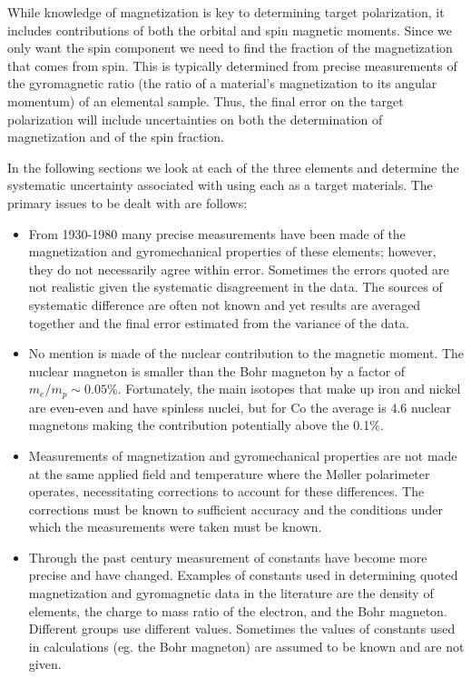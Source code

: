 \documentclass[preprint,12pt]{elsarticle}
\begin{document}
While knowledge of magnetization is key to determining target polarization, it includes contributions of both the orbital and spin magnetic moments. Since we only want the spin component we need to find the fraction of the magnetization that comes from spin. This is typically determined from precise measurements of the gyromagnetic ratio (the ratio of a material's magnetization to its angular momentum) of an elemental sample. Thus, the final error on the target polarization will include uncertainties on both the determination of magnetization and of the spin fraction.

In the following sections we look at each of the three elements and determine the systematic uncertainty associated with using each as a target materials. The primary issues to be dealt with are follows:
\begin{itemize}
\item{From 1930-1980 many precise measurements have been made of the magnetization and gyromechanical properties of these elements; however, they do not necessarily agree within error. Sometimes the errors quoted are not realistic given the systematic disagreement in the data. The sources of systematic difference are often not known and yet results are averaged together and the final error estimated from the variance of the data.}
\item{No mention is made of the nuclear contribution to the magnetic moment. The nuclear magneton is smaller than the Bohr magneton by a factor of $m_e/m_p\sim0.05\%$. Fortunately, the main isotopes that make up iron and nickel are even-even and have spinless nuclei, but for Co the average is 4.6 nuclear magnetons making the contribution potentially above the 0.1\%.}
\item{Measurements of magnetization and gyromechanical properties are not made at the same applied field and temperature where the M\o ller polarimeter operates, necessitating corrections to account for these differences. The corrections must be known to sufficient accuracy and the conditions under which the measurements were taken must be known.}
\item{Through the past century measurement of constants have become more precise and have changed. Examples of constants used in determining quoted magnetization and gyromagnetic data in the literature are the density of elements, the charge to mass ratio of the electron, and the Bohr magneton. Different groups use different values. Sometimes the values of constants used in calculations (eg. the Bohr magneton) are assumed to be known and are not given. }

\end{itemize}
\end{document}
